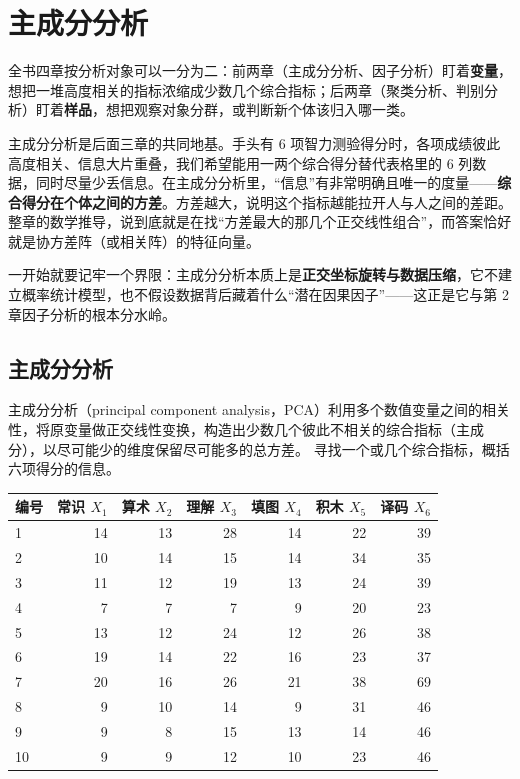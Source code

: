 \chapter{主成分分析}
全书四章按分析对象可以一分为二：前两章（主成分分析、因子分析）盯着\textbf{变量}，想把一堆高度相关的指标浓缩成少数几个综合指标；后两章（聚类分析、判别分析）盯着\textbf{样品}，想把观察对象分群，或判断新个体该归入哪一类。

主成分分析是后面三章的共同地基。手头有 6 项智力测验得分时，各项成绩彼此高度相关、信息大片重叠，我们希望能用一两个综合得分替代表格里的 6 列数据，同时尽量少丢信息。在主成分分析里，“信息”有非常明确且唯一的度量——\textbf{综合得分在个体之间的方差}。方差越大，说明这个指标越能拉开人与人之间的差距。整章的数学推导，说到底就是在找“方差最大的那几个正交线性组合”，而答案恰好就是协方差阵（或相关阵）的特征向量。

一开始就要记牢一个界限：主成分分析本质上是\textbf{正交坐标旋转与数据压缩}，它不建立概率统计模型，也不假设数据背后藏着什么“潜在因果因子”——这正是它与第 2 章因子分析的根本分水岭。
\section{主成分分析}
主成分分析（principal component analysis，PCA）利用多个数值变量之间的相关性，将原变量做正交线性变换，构造出少数几个彼此不相关的综合指标（主成分），以尽可能少的维度保留尽可能多的总方差。
寻找一个或几个综合指标，概括六项得分的信息。
\par\addvspace{5pt}\begin{center}\begin{minipage}{\linewidth}\centering
\small
{}\label{tab:iq}
\begin{tabular}{lrrrrrr}\toprule
{\bfseries 编号 }&{\bfseries  常识 $X_1$ }&{\bfseries  算术 $X_2$ }&{\bfseries  理解 $X_3$ }&{\bfseries  填图 $X_4$ }&{\bfseries  积木 $X_5$ }&{\bfseries  译码 $X_6$}\\\midrule
1 & 14 & 13 & 28 & 14 & 22 & 39\\
2 & 10 & 14 & 15 & 14 & 34 & 35\\
3 & 11 & 12 & 19 & 13 & 24 & 39\\
4 & 7 & 7 & 7 & 9 & 20 & 23\\
5 & 13 & 12 & 24 & 12 & 26 & 38\\
6 & 19 & 14 & 22 & 16 & 23 & 37\\
7 & 20 & 16 & 26 & 21 & 38 & 69\\
8 & 9 & 10 & 14 & 9 & 31 & 46\\
9 & 9 & 8 & 15 & 13 & 14 & 46\\
10 & 9 & 9 & 12 & 10 & 23 & 46\\
\bottomrule\end{tabular}
\end{minipage}\end{center}

